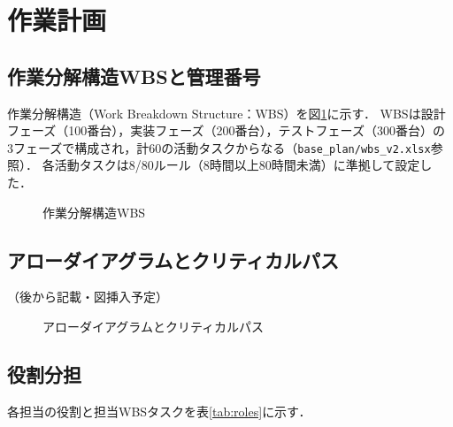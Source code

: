 \section{作業計画}

\subsection{作業分解構造WBSと管理番号}

作業分解構造（Work Breakdown Structure：WBS）を図\ref{fig:wbs}に示す．
WBSは設計フェーズ（100番台），実装フェーズ（200番台），テストフェーズ（300番台）の
3フェーズで構成され，計60の活動タスクからなる（\texttt{base\_plan/wbs\_v2.xlsx}参照）．
各活動タスクは8/80ルール（8時間以上80時間未満）に準拠して設定した．

\begin{figure}[H]
  \centering
  \caption{作業分解構造WBS}
  \label{fig:wbs}
\end{figure}

\subsection{アローダイアグラムとクリティカルパス}

（後から記載・図挿入予定）

\begin{figure}[H]
  \centering
  \caption{アローダイアグラムとクリティカルパス}
  \label{fig:arrow}
\end{figure}

\subsection{役割分担}

各担当の役割と担当WBSタスクを表\ref{tab:roles}に示す．

